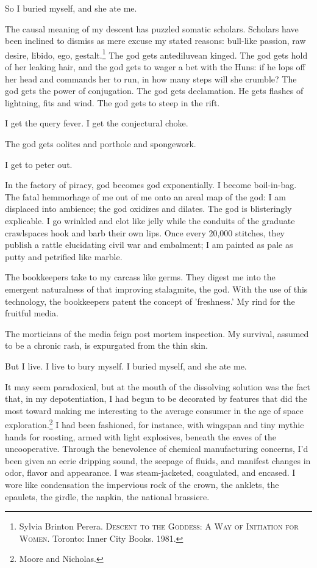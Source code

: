 \documentclass[
]{memoir}
\begin{document}
So I buried myself, and she ate me.

The causal meaning of my descent has puzzled somatic scholars. Scholars
have been inclined to dismiss as mere excuse my stated reasons:
bull-like passion, raw desire, libido, ego, gestalt.\footnote{Sylvia
  Brinton Perera. \textsc{Descent to the Goddess: A Way of Initiation
  for Women}. Toronto: Inner City Books. 1981.} The god gets
antediluvean kinged. The god gets hold of her leaking hair, and the god
gets to wager a bet with the Huns: if he lops off her head and commands
her to run, in how many steps will she crumble? The god gets the power
of conjugation. The god gets declamation. He gets flashes of lightning,
fits and wind. The god gets to steep in the rift.

I get the query fever. I get the conjectural choke.

The god gets oolites and porthole and spongework.

I get to peter out.

In the factory of piracy, god becomes god exponentially. I become
boil-in-bag. The fatal hemmorhage of me out of me onto an areal map of
the god: I am displaced into ambience; the god oxidizes and dilates. The
god is blisteringly explicable. I go wrinkled and clot like jelly while
the conduits of the graduate crawlspaces hook and barb their own lips.
Once every 20,000 stitches, they publish a rattle elucidating civil war
and embalment; I am painted as pale as putty and petrified like marble.

The bookkeepers take to my carcass like germs. They digest me into the
emergent naturalness of that improving stalagmite, the god. With the use
of this technology, the bookkeepers patent the concept of 'freshness.'
My rind for the fruitful media.

The morticians of the media feign post mortem inspection. My survival,
assumed to be a chronic rash, is expurgated from the thin skin.

But I live. I live to bury myself. I buried myself, and she ate me.

It may seem paradoxical, but at the mouth of the dissolving solution was
the fact that, in my depotentiation, I had begun to be decorated by
features that did the most toward making me interesting to the average
consumer in the age of space exploration.\footnote{Moore and Nicholas.}
I had been fashioned, for instance, with wingspan and tiny mythic hands
for roosting, armed with light explosives, beneath the eaves of the
uncooperative. Through the benevolence of chemical manufacturing
concerns, I'd been given an eerie dripping sound, the seepage of fluids,
and manifest changes in odor, flavor and appearance. I was
steam-jacketed, coagulated, and encased. I wore like condensation the
impervious rock of the crown, the anklets, the epaulets, the girdle, the
napkin, the national brassiere.
\end{document}
